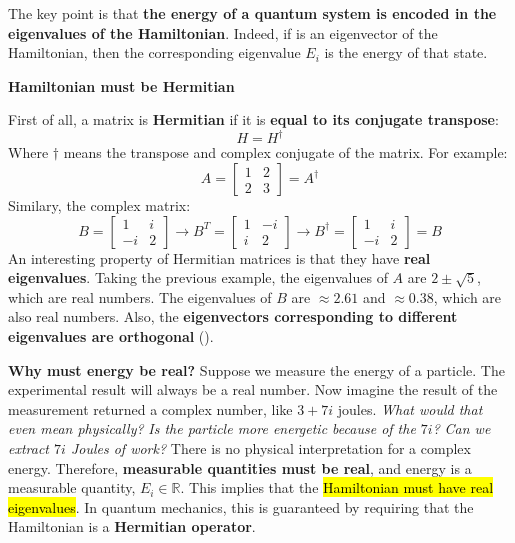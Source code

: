 \highspace
The key point is that \textbf{the energy of a quantum system is encoded in the eigenvalues of the Hamiltonian}. Indeed, if  is an eigenvector of the Hamiltonian, then the corresponding eigenvalue $E_i$ is the energy of that state.

\highspace
\begin{flushleft}
    \textcolor{Red2}{ \textbf{Hamiltonian must be Hermitian}}
\end{flushleft}
First of all, a matrix is \textbf{Hermitian} if it is \textbf{equal to its conjugate transpose}:
\begin{equation*}
    H = H^{\dagger}
\end{equation*}
Where $\dagger$ means the transpose and complex conjugate of the matrix. For example:
\begin{equation*}
    A = \begin{bmatrix}
        1 & 2 \\
        2 & 3
    \end{bmatrix} = A^{\dagger}
\end{equation*}
Similary, the complex matrix:
\begin{equation*}
    B = \begin{bmatrix}
        1 & i \\
        -i & 2
    \end{bmatrix}
    \to
    B^{T} = \begin{bmatrix}
        1 & -i \\
        i & 2
    \end{bmatrix}
    \to
    B^{\dagger} = \begin{bmatrix}
        1 & i \\
        -i & 2
    \end{bmatrix} = B
\end{equation*}
An interesting property of Hermitian matrices is that they have \textbf{real eigenvalues}. Taking the previous example, the eigenvalues of $A$ are $2 \pm \sqrt{5}$, which are real numbers. The eigenvalues of $B$ are $\approx 2.61$ and $\approx 0.38$, which are also real numbers. Also, the \textbf{eigenvectors corresponding to different eigenvalues are orthogonal} ().

\highspace
\textcolor{Green3}{ \textbf{Why must energy be real?}} Suppose we measure the energy of a particle. The experimental result will always be a real number. Now imagine the result of the measurement returned a complex number, like $3 + 7i$ joules. \emph{What would that even mean physically?} \emph{Is the particle more energetic because of the $7i$?} \emph{Can we extract $7i$ Joules of work?} There is no physical interpretation for a complex energy. Therefore, \textbf{measurable quantities must be real}, and energy is a measurable quantity, $E_{i} \in \mathbb{R}$. This implies that the \hl{Hamiltonian must have real eigenvalues}. In quantum mechanics, this is guaranteed by requiring that the Hamiltonian is a \textbf{Hermitian operator}.

